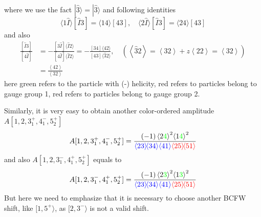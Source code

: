 \documentclass[12pt]{article}
\newcommand{\mdavg}[2]{\langle #1 \rangle\!\langle #2 \rangle}
\newcommand{\avg}[1]{\left\langle #1 \right\rangle}
\newcommand{\inavg}[2]{\langle #1 \rangle\! [#2]}
\newcommand{\rinavg}[2]{[#1]\!\langle #2 \rangle}
\begin{document}
where we use the fact $|\hat{3}\rangle=|\hat{3}\rangle$ and following identities
\begin{equation*}
    \inavg{1\hat{I}}{\hat{I}3}=\inavg{14}{43},\quad \inavg{2\hat{I}}{\hat{I}3}=\inavg{24}{43}
\end{equation*}
and also
\begin{align*}
    \frac{[\hat{I}3]}{[4\hat{I}]}&=-\frac{\rinavg{3\hat{I}}{\hat{I}2}}{\rinavg{4\hat{I}}{\hat{I}2}}=-\frac{\rinavg{34}{42}}{\rinavg{43}{\hat{3}2}},\quad(\avg{\hat{3}2}=\avg{32}+z\avg{22}=\avg{32})\\
    &=\frac{\avg{42}}{\avg{32}}
\end{align*}
here green refers to the particle with (-) helicity, red refers to particles belong to gauge group 1, red refers to particles belong to gauge group 2.
\par
Similarly, it is very easy to obtain another color-ordered amplitude $A[1,2,3_1^+,4_1^-,5_2^+]$
\begin{align*}
    A[1,2,3_1^+,4_1^-,5_2^+]=
    \frac{(-1)\avg{2\textcolor{green}{4}}^2\!\avg{1\textcolor{green}{4}}^2}{\textcolor{blue}{\mdavg{23}{34}\!\avg{41}}\textcolor{red}{\mdavg{25}{51}}}
\end{align*}
and also $A[1,2,3_1^-,4_1^+,5_2^+]$ equals to
\begin{equation*}
    A[1,2,3_1^-,4_1^+,5_2^+]=
    \frac{(-1)\avg{2\textcolor{green}{3}}^2\!\avg{1\textcolor{green}{3}}^2}{\textcolor{blue}{\mdavg{23}{34}\!\avg{41}}\textcolor{red}{\mdavg{25}{51}}}
\end{equation*}
But here we need to emphasize that it is necessary to choose another BCFW shift, like $[1,5^+ \rangle$, as $[2,3^- \rangle$ is not a valid shift. 
\end{document}
